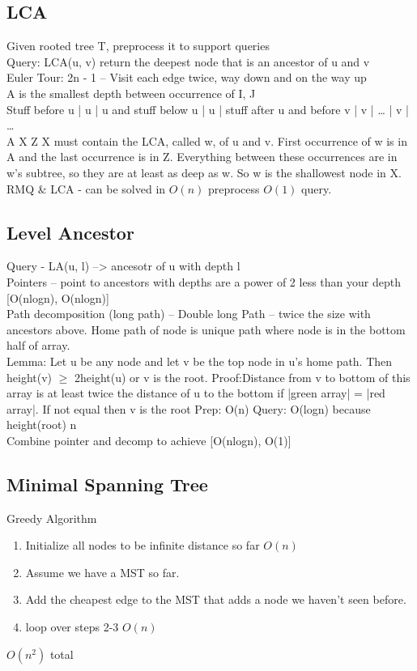 \documentclass[10pt,twocolumn]{article}
\begin{document}
\subsection{LCA}
Given rooted tree T, preprocess it to support queries\\
Query: LCA(u, v) return the deepest node that is an ancestor of u and v\\
Euler Tour:
2n - 1 -- Visit each edge twice, way down and on the way up\\
A is the smallest depth between occurrence of I, J\\
Stuff before u | u | u and stuff below u | u | stuff after u and before v | v | … | v | …\\
    A                       X             Z
X must contain the LCA, called w, of u and v.  First occurrence of w is in A and the last occurrence is in Z.
Everything between these occurrences are in w’s subtree, so they are at least as deep as w.  So w is the shallowest node in X.\\
RMQ \& LCA - can be solved in $O(n)$ preprocess $O(1)$ query.

\subsection{Level Ancestor}
Query - LA(u, l) --> ancesotr of u with depth l\\
Pointers -- point to ancestors with depths are a power of 2 less than your depth [O(nlogn), O(nlogn)]\\
Path decomposition (long path) -- Double long Path -- twice the size with ancestors above.
Home path of node is unique path where node is in the bottom half of array.\\
Lemma: Let u be any node and let v be the top node in u's home path.  Then height(v) $\geq$ 2height(u) or v is the root.
Proof:Distance from v to bottom of this array is at least twice the distance of u to the bottom if |green array| = |red array|.  If not equal then v is the root
Prep: O(n)
Query: O(logn)  because height(root) n\\
Combine pointer and decomp to achieve [O(nlogn), O(1)]

\subsection{Minimal Spanning Tree}
Greedy Algorithm
\begin{enumerate}
    \item Initialize all nodes to be infinite distance so far $O(n)$
    \item Assume we have a MST so far.
    \item Add the cheapest edge to the MST that adds a node we haven't seen before.
    \item loop over steps 2-3 $O(n)$
\end{enumerate}
$O(n^2)$ total\\
\end{document}
